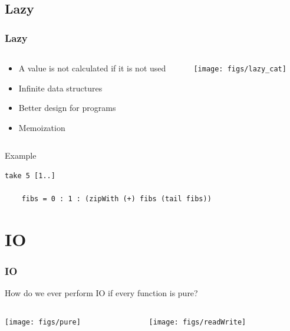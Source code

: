 \documentclass{beamer}
\begin{document}
\subsection{Lazy}
\begin{frame}[fragile]
\frametitle{Lazy}

 \begin{columns}[]
  \begin{column}[]{5cm}
   \begin{itemize}
  \item A value is not calculated if it is not used
  \item Infinite data structures
  \item Better design for programs
  \item Memoization
 \end{itemize}
  \end{column}
  \begin{column}[]{5cm}
    \texttt{[image: figs/lazy\_cat]}
  \end{column}
 \end{columns}

 \vspace{0.5cm}
 \begin{block}{Example}
  \begin{lstlisting}[basicstyle=\small]
    take 5 [1..]

    fibs = 0 : 1 : (zipWith (+) fibs (tail fibs))
  \end{lstlisting}
 \end{block}
 
\end{frame}

\section{IO}
\begin{frame}
\frametitle{IO}

 How do we ever perform IO if every function is pure?
  \vspace{1cm}
  \begin{columns}[]
   \begin{column}[]{5cm}
    \texttt{[image: figs/pure]}
   \end{column}
   \begin{column}[]{5cm}
    \texttt{[image: figs/readWrite]}
   \end{column}
  \end{columns}

\end{frame}
\end{document}
